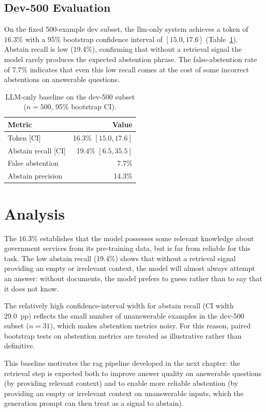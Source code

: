 \subsection{Dev-500 Evaluation}

On the fixed 500-example dev subset, the \gls{llm}-only system achieves a token
\fone{} of $16.3\%$ with a 95\% bootstrap confidence interval of
$[15.0, 17.6]$ (Table~\ref{tab:llm:dev500}). Abstain recall is low (19.4\%),
confirming that without a retrieval signal the model rarely produces the expected
abstention phrase. The false-abstention rate of 7.7\% indicates that even this
low recall comes at the cost of some incorrect abstentions on answerable questions.

\begin{table}[ht]
    \centering
    \caption{LLM-only baseline on the dev-500 subset ($n = 500$, 95\% bootstrap CI).}
    \label{tab:llm:dev500}
    \begin{tabular}{lr}
        \toprule
        Metric & Value \\
        \midrule
        Token \fone{} [CI]   & 16.3\% $[15.0, 17.6]$ \\
        Abstain recall [CI]  & 19.4\% $[6.5, 35.5]$ \\
        False abstention     & 7.7\% \\
        Abstain precision    & 14.3\% \\
        \bottomrule
    \end{tabular}
\end{table}


\section{Analysis}

The 16.3\% \fone{} establishes that the model possesses some relevant knowledge
about government services from its pre-training data, but is far from reliable for
this task. The low abstain recall (19.4\%) shows that without a retrieval signal
providing an empty or irrelevant context, the model will almost always attempt an
answer: without documents, the model prefers to guess rather than to say that it does
not know.

The relatively high confidence-interval width for abstain recall (CI width 29.0~pp)
reflects the small number of unanswerable examples in the dev-500 subset ($n = 31$),
which makes abstention metrics noisy. For this reason, paired bootstrap tests on
abstention metrics are treated as illustrative rather than definitive.

This baseline motivates the \gls{rag} pipeline developed in the next chapter: the
retrieval step is expected both to improve answer quality on answerable questions
(by providing relevant context) and to enable more reliable abstention (by providing
an empty or irrelevant context on unanswerable inputs, which the generation prompt
can then treat as a signal to abstain).
